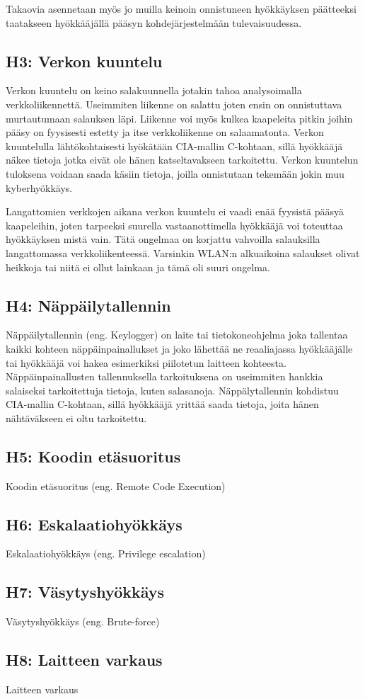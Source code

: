Takaovia asennetaan myös jo muilla keinoin onnistuneen hyökkäyksen päätteeksi taatakseen hyökkääjällä pääsyn kohdejärjestelmään tulevaisuudessa.

\subsection{H3: Verkon kuuntelu}
Verkon kuuntelu on keino salakuunnella jotakin tahoa analysoimalla verkkoliikennettä. Useimmiten liikenne on salattu joten ensin on onnistuttava murtautumaan salauksen läpi. Liikenne voi myös kulkea kaapeleita pitkin joihin pääsy on fyysisesti estetty ja itse verkkoliikenne on salaamatonta. Verkon kuuntelulla lähtökohtaisesti hyökätään CIA-mallin C-kohtaan, sillä hyökkääjä näkee tietoja jotka eivät ole hänen katseltavakseen tarkoitettu. Verkon kuuntelun tuloksena voidaan saada käsiin tietoja, joilla onnistutaan tekemään jokin muu kyberhyökkäys.

Langattomien verkkojen aikana verkon kuuntelu ei vaadi enää fyysistä pääsyä kaapeleihin, joten tarpeeksi suurella vastaanottimella hyökkääjä voi toteuttaa hyökkäyksen mistä vain. Tätä ongelmaa on korjattu vahvoilla salauksilla langattomassa verkkoliikenteessä. Varsinkin WLAN:n alkuaikoina salaukset olivat heikkoja tai niitä ei ollut lainkaan ja tämä oli suuri ongelma.

\subsection{H4: Näppäilytallennin}
Näppäilytallennin (eng. Keylogger) on laite tai tietokoneohjelma joka tallentaa kaikki kohteen näppäinpainallukset ja joko lähettää ne reaaliajassa hyökkääjälle tai hyökkääjä voi hakea esimerkiksi piilotetun laitteen kohteesta. Näppäinpainallusten tallennuksella tarkoituksena on useimmiten hankkia salaiseksi tarkoitettuja tietoja, kuten salasanoja. Näppälytallennin kohdistuu CIA-mallin C-kohtaan, sillä hyökkääjä yrittää saada tietoja, joita hänen nähtäväkseen ei oltu tarkoitettu.

\subsection{H5: Koodin etäsuoritus}
Koodin etäsuoritus (eng. Remote Code Execution)

\subsection{H6: Eskalaatiohyökkäys}
Eskalaatiohyökkäys (eng. Privilege escalation)

\subsection{H7: Väsytyshyökkäys}
Väsytyshyökkäys (eng. Brute-force)

\subsection{H8: Laitteen varkaus}
Laitteen varkaus
